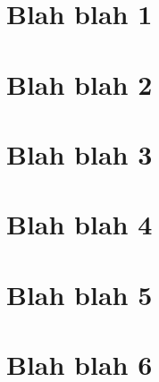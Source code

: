 \documentclass{article}
\begin{document}
    \section{Blah blah 1}
    \clearpage
    \section{Blah blah 2}
    \clearpage
    \section{Blah blah 3}
    \clearpage
    \section{Blah blah 4}
    \clearpage
    \section{Blah blah 5}
    \clearpage
    \section{Blah blah 6}
\end{document}
